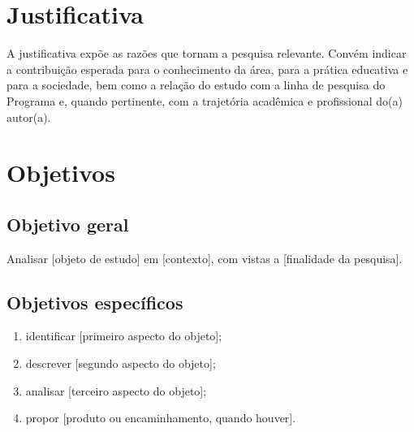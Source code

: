 \section{Justificativa}
\label{sec:justificativa}

A justificativa expõe as razões que tornam a pesquisa relevante. Convém indicar a contribuição esperada para o conhecimento da área, para a prática educativa e para a sociedade, bem como a relação do estudo com a linha de pesquisa do Programa e, quando pertinente, com a trajetória acadêmica e profissional do(a) autor(a).

\section{Objetivos}
\label{sec:objetivos}

\subsection{Objetivo geral}

Analisar [objeto de estudo] em [contexto], com vistas a [finalidade da pesquisa].

\subsection{Objetivos específicos}

\begin{enumerate}[label=\alph*), leftmargin=1.5cm+\labelwidth, itemsep=0pt]
  \item identificar [primeiro aspecto do objeto];
  \item descrever [segundo aspecto do objeto];
  \item analisar [terceiro aspecto do objeto];
  \item propor [produto ou encaminhamento, quando houver].
\end{enumerate}


